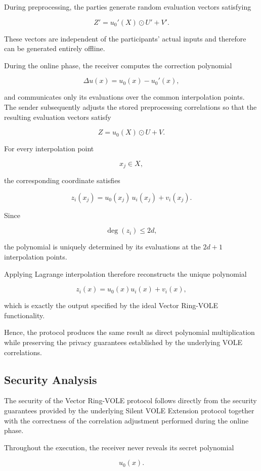 \documentclass[11pt,a4paper]{article}
\begin{document}
During preprocessing, the parties generate random evaluation vectors satisfying

\[
Z'
=
u_0'(X)\odot U'
+
V'.
\]

These vectors are independent of the participants' actual inputs and therefore can be generated entirely
offline.

During the online phase, the receiver computes the correction polynomial

\[
\Delta u(x)
=
u_0(x)-u_0'(x),
\]

and communicates only its evaluations over the common interpolation points. The sender subsequently
adjusts the stored preprocessing correlations so that the resulting evaluation vectors satisfy

\[
Z
=
u_0(X)\odot U
+
V.
\]

For every interpolation point

\[
x_j\in X,
\]

the corresponding coordinate satisfies

\[
z_i(x_j)
=
u_0(x_j)\,
u_i(x_j)
+
v_i(x_j).
\]

Since

\[
\deg(z_i)\le2d,
\]

the polynomial is uniquely determined by its evaluations at the
$2d+1$ interpolation points.

Applying Lagrange interpolation therefore reconstructs the unique polynomial

\[
z_i(x)
=
u_0(x)u_i(x)
+
v_i(x),
\]

which is exactly the output specified by the ideal Vector Ring-VOLE functionality.

Hence, the protocol produces the same result as direct polynomial multiplication while preserving the
privacy guarantees established by the underlying VOLE correlations.
 

\subsection{Security Analysis}

The security of the Vector Ring-VOLE protocol follows directly from the security guarantees provided by
the underlying Silent VOLE Extension protocol together with the correctness of the correlation adjustment
performed during the online phase.

Throughout the execution, the receiver never reveals its secret polynomial

\[
u_0(x).
\]
\end{document}
